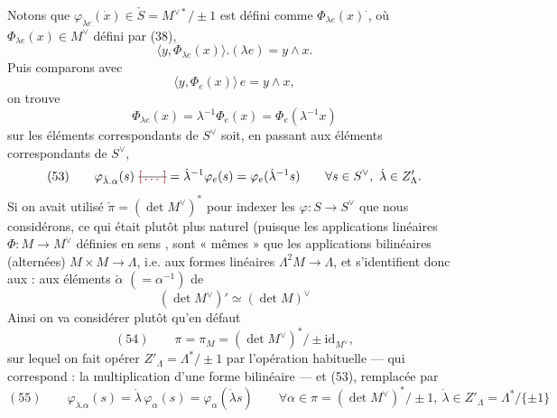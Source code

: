 \documentclass[11pt,a4paper]{article}
\begin{document}
Notons que
$\varphi_{\dot{\lambda} e}(\dot{x}) \in \check{S} = M^{\vee *}/\pm 1$ est défini
comme $\Phi_{\lambda e}(x)^{\cdot}$, où $\Phi_{\lambda e}(x) \in M^{\vee}$ défini
par (38),
\[
\langle y, \Phi_{\lambda e}(x) \rangle . (\lambda e) = y \wedge x .
\]
Puis comparons avec
\[
\langle y, \Phi_e(x) \rangle\, e = y \wedge x ,
\]
on trouve
\[
\Phi_{\lambda e}(x) = \lambda^{-1} \Phi_e(x) = \Phi_e(\lambda^{-1} x)
\]
sur les éléments correspondants de $S^{\vee}$
soit, en passant aux éléments correspondants de $S^{\vee}$,
\[
(53)\qquad \varphi_{\dot{\lambda} . \alpha}(s)\ \text{\struck{\ill{}}} = \dot{\lambda}^{-1} \varphi_e(s) = \varphi_e(\dot{\lambda}^{-1} s)
\qquad \forall s \in S^{\vee},\ \dot{\lambda} \in Z'_{\Lambda} .
\]
Si on avait utilisé $\check{\pi} = (\det M^{\vee})^{*}$ pour indexer les
$\varphi : S \to S^{\vee}$ que nous considérons, ce qui était plutôt plus
naturel (puisque les applications linéaires
 $\Phi : M \to M^{\vee}$ définies en sens
, sont  « mêmes » que les applications
 bilinéaires (alternées) $M \times M \to \Lambda$, i.e. aux
formes linéaires $\Lambda^2 M \to \Lambda$, et s'identifient donc aux
\ill{} : aux éléments $\check{\alpha}$ $(= \alpha^{-1})$ de
\[
(\det M^{\vee})' \simeq (\det M)^{\vee}
\]
Ainsi on va considérer plutôt qu'en défaut
\[
(54)\qquad \pi = \pi_M = (\det M^{\vee})^{*}/\pm \mathrm{id}_{M^{\vee}},
\]
sur lequel on fait opérer $Z'_{\Lambda} = \Lambda^{*}/\pm 1$ par l'opération
habituelle — qui correspond \struck{\ill{}} : la multiplication d'une forme
bilinéaire — et (53), \struck{\ill{}} remplacée par
\[
(55)\qquad
\boxed{\varphi_{\dot{\lambda} . \alpha}(s) = \dot{\lambda}\, \varphi_{\alpha}(s) = \varphi_{\alpha}(\dot{\lambda} s)}
\qquad \forall \alpha \in \pi = (\det M^{\vee})^{*}/\pm 1,\ \dot{\lambda} \in Z'_{\Lambda} = \Lambda^{*}/\{\pm 1\}
\]
\end{document}
